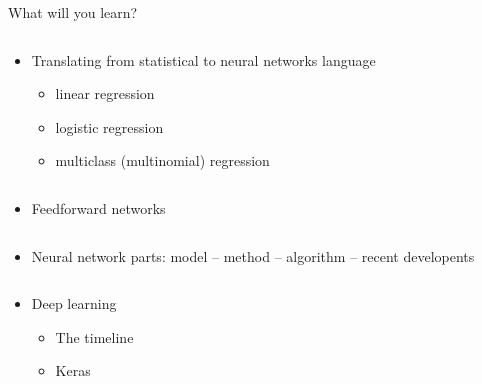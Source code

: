 \documentclass[10pt,ignorenonframetext,]{beamer}
\providecommand{\tightlist}{%
  \setlength{\itemsep}{0pt}\setlength{\parskip}{0pt}}
\begin{document}
\begin{frame}

\begin{block}{What will you learn?}

\(~\)

\begin{itemize}
\tightlist
\item
  Translating from statistical to neural networks language

  \begin{itemize}
  \tightlist
  \item
    linear regression
  \item
    logistic regression
  \item
    multiclass (multinomial) regression
  \end{itemize}
\end{itemize}

\(~\)

\begin{itemize}
\tightlist
\item
  Feedforward networks
\end{itemize}

\(~\)

\begin{itemize}
\tightlist
\item
  Neural network parts: model -- method -- algorithm -- recent
  developents
\end{itemize}

\(~\)

\begin{itemize}
\tightlist
\item
  Deep learning

  \begin{itemize}
  \tightlist
  \item
    The timeline
  \item
    Keras
  \end{itemize}
\end{itemize}

\end{block}

\end{frame}
\end{document}
